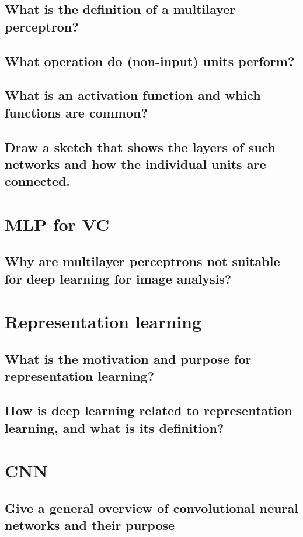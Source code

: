 \subsection{What is the definition of a multilayer perceptron?}
\subsection{What operation do (non-input) units perform?}
\subsection{What is an activation function and which functions are common?}
\subsection{Draw a sketch that shows the layers of such networks and how the individual units are connected.}

\section{MLP for VC}
\subsection{Why are multilayer perceptrons not suitable for deep learning for image analysis?}

\section{Representation learning}
\subsection{What is the motivation and purpose for representation learning?}
\subsection{How is deep learning related to representation learning, and what is its definition?}



\section{CNN}
\subsection{Give a general overview of convolutional neural networks and their purpose}
